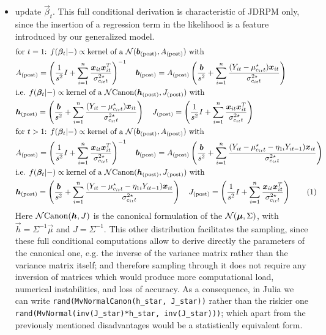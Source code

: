 \documentclass[12pt,	%
	a4paper,		%
	twoside,		%
	openright,		%
	titlepage,%
	]{book}
\newcommand\numberthis{\addtocounter{equation}{1}\tag{\theequation}}
\theoremstyle{definition}
\newcommand{\mjline}[1]{\texttt{#1}}
\begin{document}
\begin{itemize}
\item update $\vec{\beta}_t$. This full conditional derivation is characteristic of JDRPM only, since the insertion of a regression term in the likelihood is a feature introduced by our generalized model.
\begin{align*}
&  \text{for $t=1$} \text{: }
  f(\vec{\beta}_t|-) \propto \text{kernel of a $\N(\vec{b}_\post, A_\post)$ with}\\
 &A_\post = \left( \frac{1}{s^2}I + \sum_{i=1}^n \frac{\vec{x}_{it}\vec{x}_{it}^T}{\sigma^{2\star}_{c_{it}t}}\right)^{-1} \quad
\vec{b}_\post = A_\post \left( \frac{\vec{b}}{s^2} +\sum_{i=1}^n \frac{(Y_{it}-\mu^\star_{c_{it}t})\vec{x}_{it}}{\sigma^{2\star}_{c_{it}t}} \right) \\
&\text{i.e. } f(\vec{\beta}_t|-) \propto \text{kernel of a $\Ncan(\vec{h}_\post, J_\post)$ with}\\
&\vec{h}_\post = \left( \frac{\vec{b}}{s^2} +\sum_{i=1}^n \frac{(Y_{it}-\mu^\star_{c_{it}t})\vec{x}_{it}}{\sigma^{2\star}_{c_{it}t}} \right) \quad
J_\post = \left( \frac{1}{s^2}I + \sum_{i=1}^n \frac{\vec{x}_{it}\vec{x}_{it}^T}{\sigma^{2\star}_{c_{it}t}}\right)\\
& \text{for $t>1$} \text{: }
 f(\vec{\beta}_t|-) \propto \text{kernel of a $\N(\vec{b}_\post, A_\post)$ with}\\
 &A_\post = \left( \frac{1}{s^2}I + \sum_{i=1}^n \frac{\vec{x}_{it}\vec{x}_{it}^T}{\sigma^{2\star}_{c_{it}t}}\right)^{-1} \quad
\vec{b}_\post = A_\post \left( \frac{\vec{b}}{s^2} +\sum_{i=1}^n \frac{(Y_{it}-\mu^\star_{c_{it}t}- \eta_{1i}Y_{it-1})\vec{x}_{it}}{\sigma^{2\star}_{c_{it}t}} \right) \\
 &\text{i.e. } f(\vec{\beta}_t|-) \propto \text{kernel of a $\Ncan(\vec{h}_\post, J_\post)$ with}\\
&\vec{h}_\post = \left( \frac{\vec{b}}{s^2} +\sum_{i=1}^n \frac{(Y_{it}-\mu^\star_{c_{it}t}- \eta_{1i}Y_{it-1})\vec{x}_{it}}{\sigma^{2\star}_{c_{it}t}} \right) \quad
J_\post  = \left( \frac{1}{s^2}I + \sum_{i=1}^n \frac{\vec{x}_{it}\vec{x}_{it}^T}{\sigma^{2\star}_{c_{it}t}}\right)
 \numberthis \label{update betat}
\end{align*}
Here $\mathcal{N}\text{Canon}(\boldsymbol{h},J)$ is the canonical formulation of the $\mathcal{N}(\boldsymbol{\mu},\Sigma)$, with $\vec{h} = \Sigma^{-1}\vec{\mu}$ and $J = \Sigma^{-1}$. This other distribution facilitates the sampling, since these full conditional computations allow to derive directly the parameters of the canonical one, e.g. the inverse of the variance matrix rather than the variance matrix itself; and therefore sampling through it does not require any inversion of matrices which would produce more computational load, numerical instabilities, and loss of accuracy. As a consequence, in Julia we can write
\mjline{rand(MvNormalCanon(h_star, J_star))}
rather than the riskier one
\mjline{rand(MvNormal(inv(J_star)*h_star, inv(J_star)))}; which apart from the previously mentioned disadvantages would be a statistically equivalent form.


\end{itemize}
\end{document}
